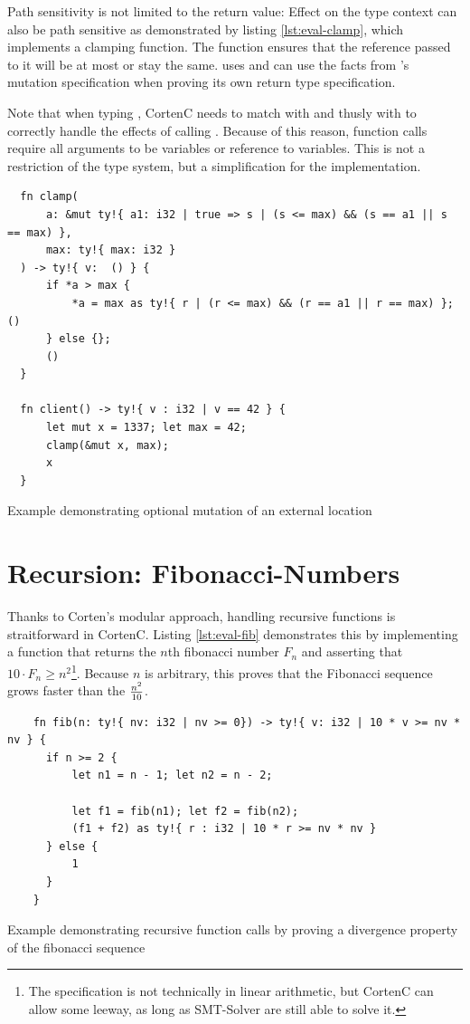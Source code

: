 \documentclass[twoside, english]{sdqthesis}
\theoremstyle{definition}
\begin{document}
Path sensitivity is not limited to the return value: Effect on the type context can also be path sensitive as demonstrated by listing \ref{lst:eval-clamp}, which implements a clamping function. The function  ensures that the reference passed to it will be at most  or stay the same.  uses  and can use the facts from 's mutation specification when proving its own return type specification.

Note that when typing , CortenC needs to match  with  and thusly  with  to correctly handle the effects of calling . Because of this reason, function calls require all arguments to be variables or reference to variables. This is not a restriction of the type system, but a simplification for the implementation.

\begin{listing}[ht]
  \begin{verbatim}
  fn clamp(
      a: &mut ty!{ a1: i32 | true => s | (s <= max) && (s == a1 || s == max) }, 
      max: ty!{ max: i32 }
  ) -> ty!{ v:  () } {
      if *a > max {
          *a = max as ty!{ r | (r <= max) && (r == a1 || r == max) }; ()
      } else {};
      ()
  }

  fn client() -> ty!{ v : i32 | v == 42 } {
      let mut x = 1337; let max = 42;
      clamp(&mut x, max);
      x
  }
  \end{verbatim}
  \caption{Example demonstrating optional mutation of an external location}
  \label{lst:eval-clamp}
\end{listing}

\section{Recursion: Fibonacci-Numbers}

Thanks to Corten's modular approach, handling recursive functions is straitforward in CortenC. Listing \ref{lst:eval-fib} demonstrates this by implementing a function that returns the $n$th fibonacci number $F_n$ and asserting that $10\cdot F_n \geq n^2$\footnote{The specification is not technically in linear arithmetic, but CortenC can allow some leeway, as long as SMT-Solver are still able to solve it.}. Because $n$ is arbitrary, this proves that the Fibonacci sequence grows faster than the $n^2\over10$.


\begin{listing}[ht]
  \begin{verbatim}
    fn fib(n: ty!{ nv: i32 | nv >= 0}) -> ty!{ v: i32 | 10 * v >= nv * nv } {
      if n >= 2 {
          let n1 = n - 1; let n2 = n - 2;

          let f1 = fib(n1); let f2 = fib(n2);
          (f1 + f2) as ty!{ r : i32 | 10 * r >= nv * nv }
      } else {
          1
      }
    }
  \end{verbatim}
  \caption{Example demonstrating recursive function calls by proving a divergence property of the fibonacci sequence}
  \label{lst:eval-fib}
\end{listing}
\end{document}
